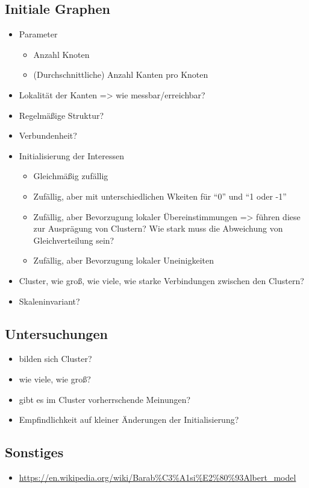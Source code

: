 \documentclass[11pt, a4paper]{scrartcl}
\begin{document}
\subsection{Initiale Graphen}
\begin{itemize}
\item Parameter\begin{itemize}
	\item Anzahl Knoten
	\item (Durchschnittliche) Anzahl Kanten pro Knoten
\end{itemize}
\item Lokalität der Kanten => wie messbar/erreichbar?
\item Regelmäßige Struktur?
\item Verbundenheit?
\item Initialisierung der Interessen\begin{itemize}
	\item Gleichmäßig zufällig
	\item Zufällig, aber mit unterschiedlichen Wkeiten für "`0"' und "`1 oder -1"'
	\item Zufällig, aber Bevorzugung lokaler Übereinstimmungen => führen diese zur Ausprägung von Clustern? Wie stark muss die Abweichung von Gleichverteilung sein?
	\item Zufällig, aber Bevorzugung lokaler Uneinigkeiten
\end{itemize}
\item Cluster, wie groß, wie viele, wie starke Verbindungen zwischen den Clustern?
\item Skaleninvariant?
\end{itemize}

\subsection{Untersuchungen}
\begin{itemize}
\item bilden sich Cluster?
\item wie viele, wie groß?
\item gibt es im Cluster vorherrschende Meinungen?
\item Empfindlichkeit auf kleiner Änderungen der Initialisierung?
\end{itemize}

\subsection{Sonstiges}
\begin{itemize}
\item \url{https://en.wikipedia.org/wiki/Barab%C3%A1si%E2%80%93Albert_model}
\end{itemize}
\end{document}
